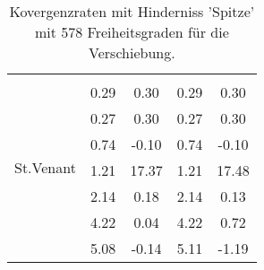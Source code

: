 \begin{table}
\begin{tabular}{c|cc|cc|}
\hline 
\multicolumn{1}{|c|}{\multirow{8}{*}{St.Venant}} &\multicolumn{1}{|c|}{} & \multicolumn{1}{|c|}{} & \multicolumn{1}{|c|}{} & \multicolumn{1}{|c|}{} \\ 
\multicolumn{1}{|c|}{} & \multicolumn{1}{|c|}{      0.29} & \multicolumn{1}{|c|}{      0.30} & \multicolumn{1}{|c|}{      0.29} & \multicolumn{1}{|c|}{      0.30} \\ 
\multicolumn{1}{|c|}{} & \multicolumn{1}{|c|}{      0.27} & \multicolumn{1}{|c|}{      0.30} & \multicolumn{1}{|c|}{      0.27} & \multicolumn{1}{|c|}{      0.30} \\ 
\multicolumn{1}{|c|}{} & \multicolumn{1}{|c|}{      0.74} & \multicolumn{1}{|c|}{     -0.10} & \multicolumn{1}{|c|}{      0.74} & \multicolumn{1}{|c|}{     -0.10} \\ 
\multicolumn{1}{|c|}{} & \multicolumn{1}{|c|}{      1.21} & \multicolumn{1}{|c|}{     17.37} & \multicolumn{1}{|c|}{      1.21} & \multicolumn{1}{|c|}{     17.48} \\ 
\multicolumn{1}{|c|}{} & \multicolumn{1}{|c|}{      2.14} & \multicolumn{1}{|c|}{      0.18} & \multicolumn{1}{|c|}{      2.14} & \multicolumn{1}{|c|}{      0.13} \\ 
\multicolumn{1}{|c|}{} & \multicolumn{1}{|c|}{      4.22} & \multicolumn{1}{|c|}{      0.04} & \multicolumn{1}{|c|}{      4.22} & \multicolumn{1}{|c|}{      0.72} \\ 
\multicolumn{1}{|c|}{} & \multicolumn{1}{|c|}{      5.08} & \multicolumn{1}{|c|}{     -0.14} & \multicolumn{1}{|c|}{      5.11} & \multicolumn{1}{|c|}{     -1.19} \\ 
\hline 
\end{tabular}\caption{Kovergenzraten mit Hinderniss 'Spitze' mit 578 Freiheitsgraden für die Verschiebung.}\label{tab:Rate_Spitze_level3}
\end{table} 
